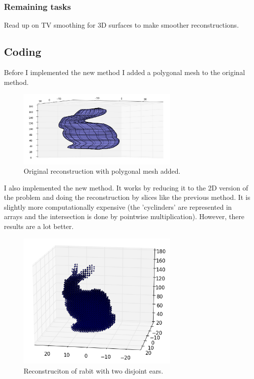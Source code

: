 \documentclass[a4paper]{article}
\begin{document}
\subsubsection{Remaining tasks}
Read up on TV smoothing for 3D surfaces to make smoother reconstructions.

\subsection{Coding}
Before I implemented the new method I added a polygonal mesh to the original method.

\begin{figure}[H]
  \centering
    \includegraphics[width=0.7\textwidth]{figures/polygonal_mesh.png}
    \caption{Original reconstruction with polygonal mesh added.}
  \label{fig:f2}
\end{figure}

I also implemented the new method.
It works by reducing it to the 2D version of the problem and doing the reconstruction by slices like the previous method.
It is slightly more computationally expensive (the 'cyclinders' are represented in arrays and the intersection is done by pointwise multiplication).
However, there results are a lot better.

\begin{figure}[H]
  \centering
    \includegraphics[width=0.7\textwidth]{figures/rabit_ears_3.png}
    \caption{Reconstruciton of rabit with two disjoint ears.}
  \label{fig:f2}
\end{figure}
\end{document}
